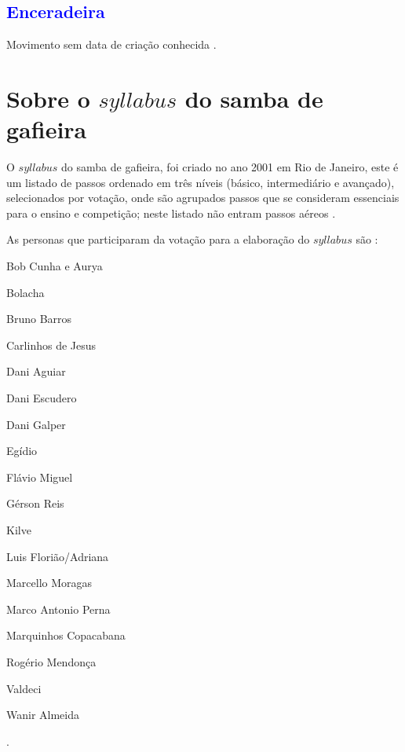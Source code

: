 \subsection{\textcolor{blue}{Enceradeira}}
Movimento sem data de criação conhecida \cite[pp. 144]{perna2002samba}.

\section{Sobre o $syllabus$ do samba de gafieira}

O $syllabus$  do samba de gafieira, foi criado no ano 2001 em Rio de Janeiro,
este é um listado de passos ordenado em três níveis (básico, intermediário e avançado),
selecionados por votação,
onde são agrupados passos que se consideram essenciais para o ensino e competição;
neste listado não entram passos aéreos \cite[pp. 144]{perna2002samba}.


As personas que participaram da votação para a elaboração do $syllabus$ são \cite[pp. 144]{perna2002samba}:
\begin{inparaitem}[$*$]
\item Bob Cunha e Aurya
\item Bolacha
\item Bruno Barros
\item Carlinhos de Jesus
\item Dani Aguiar
\item Dani Escudero
\item Dani Galper
\item Egídio
\item Flávio Miguel
\item Gérson Reis
\item Kilve
\item Luis Florião/Adriana
\item Marcello Moragas
\item Marco Antonio Perna
\item Marquinhos Copacabana
\item Rogério Mendonça
\item Valdeci
\item Wanir Almeida
\end{inparaitem}.\\



